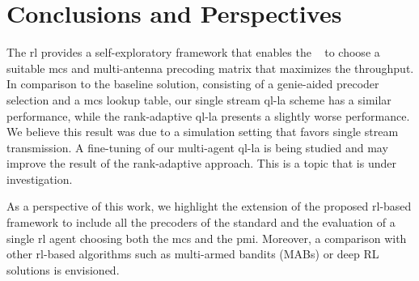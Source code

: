 \section{Conclusions and Perspectives}
\label{sec:la-conclusion}
The \gls{rl} provides a self-exploratory framework that enables the \bs~ to choose a suitable \gls{mcs} and multi-antenna precoding matrix that maximizes the throughput.
%
%
In comparison to the baseline solution, consisting of a genie-aided precoder selection and a \gls{mcs} lookup table, our single stream \gls{ql-la} scheme has a similar performance, while the rank-adaptive \gls{ql-la} presents a slightly worse performance.
%
We believe this result was due to a simulation setting that favors single stream transmission.
%
A fine-tuning of our multi-agent \gls{ql-la} is being studied and may improve the result of the rank-adaptive approach.
%
This is a topic that is under investigation.

As a perspective of this work, we highlight the extension of the proposed \gls{rl}-based framework to include all the precoders of the standard \cite{3gpp.38.214} and the evaluation of a single \gls{rl} agent choosing both the \gls{mcs} and the \gls{pmi}.
%
Moreover, a comparison with other \gls{rl}-based algorithms such as multi-armed bandits (MABs) \cite{zhou2015survey} or deep RL solutions \cite{DeepRLSurvey} is envisioned.
%
